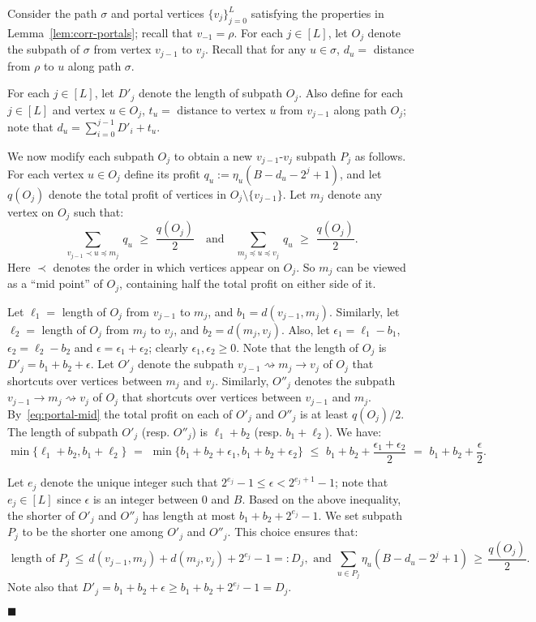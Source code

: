 \documentclass[11pt,letterpaper]{article}
\numberwithin{algorithm}{section}
\newenvironment{proof}{

\noindent{\bf Proof:}}
{\hfill$\blacksquare$


}
\begin{document}
\begin{proof}
Consider the path $\sigma$ and portal vertices $\{v_j\}_{j=0}^L$ satisfying the properties in Lemma~\ref{lem:corr-portals}; recall that $v_{-1}=\rho$. For each $j\in[L]$, let $O_j$ denote the subpath of $\sigma$ from vertex $v_{j-1}$ to $v_j$. Recall that for any $u\in \sigma$, $d_u=$ distance from $\rho$ to $u$ along path $\sigma$.

For each $j\in[L]$, let $D'_j$ denote the length of subpath $O_j$. Also define for each $j\in[L]$ and vertex $u\in O_j$, $t_u=$ distance to vertex $u$ from $v_{j-1}$ along path $O_j$; note that $d_u=\sum_{i=0}^{j-1} D'_i + t_u$.

We now modify each subpath $O_j$ to obtain a new $v_{j-1}$-$v_j$ subpath $P_j$ as follows. For each vertex $u\in O_j$ define its profit $q_u:=\eta_u(B-d_u-2^j+1)$, and let $q(O_j)$ denote the total profit of vertices in $O_j\setminus \{v_{j-1}\}$. Let $m_j$ denote any vertex on $O_j$ such that:
\begin{equation} \label{eq:portal-mid} \sum_{v_{j-1}\prec u \preceq m_j} \, q_u \,\,\ge \,\,\frac{q(O_j)}{2}\quad \mbox{and} \quad  \sum_{m_{j}\preceq u \preceq v_j} \, q_u \,\, \ge \,\,\frac{q(O_j)}{2} .
\end{equation}
Here $\prec$ denotes the order in which vertices appear on $O_j$. So $m_j$ can be viewed as a ``mid point'' of $O_j$, containing half the total profit on either side of it.

Let $\ell_1=$ length of $O_j$ from $v_{j-1}$ to $m_j$, and $b_1=d(v_{j-1},m_j)$. Similarly, let $\ell_2=$ length of $O_j$ from $m_{j}$ to $v_j$, and $b_2=d(m_{j},v_j)$. Also, let $\epsilon_1=\ell_1-b_1$, $\epsilon_2=\ell_2-b_2$ and $\epsilon=\epsilon_1+\epsilon_2$; clearly $\epsilon_1,\epsilon_2\ge 0$. Note that the length of $O_j$ is $D'_j=b_1+b_2+\epsilon$. Let $O'_j$ denote the subpath  $v_{j-1} \rightsquigarrow m_j \rightarrow v_j$ of $O_j$ that shortcuts over vertices between $m_j$ and $v_j$. Similarly, $O''_j$ denotes the subpath  $v_{j-1} \rightarrow m_j \rightsquigarrow v_j$ of $O_j$ that shortcuts over vertices between $v_{j-1}$ and $m_j$. By~\eqref{eq:portal-mid} the total profit on each of $O'_j$ and $O''_j$ is at least $q(O_j)/2$.
The length of subpath $O'_j$ (resp. $O''_j$) is $\ell_1+b_2$ (resp. $b_1+\ell_2$). We have:
$$\min\{\ell_1+b_2, b_1+\ell_2\} \,\, = \,\,  \min\{b_1+b_2+\epsilon_1, b_1+b_2 + \epsilon_2\}   \,\, \le  \,\, b_1+b_2 +\frac{\epsilon_1+\epsilon_2}{2}  \,\, =  \,\, b_1+b_2 +\frac{\epsilon}2.$$

Let $e_j$ denote the unique integer such that $2^{e_j}-1\le \epsilon< 2^{e_j+1}-1$; note that $e_j\in [L]$ since $\epsilon$ is an integer between $0$ and $B$. Based on the above inequality, the shorter of $O'_j$ and $O''_j$ has length at most $b_1+b_2+2^{e_j}-1$. We set subpath $P_j$ to be the shorter one among $O'_j$ and $O''_j$. This choice ensures that:
\begin{equation} \label{eq:enum-subpath}
\mbox{ length of } P_j \,\le\, d(v_{j-1},m_j)+d(m_j,v_j)+2^{e_j}-1=:D_j,\,\,\mbox{and}\,\, \sum_{u\in P_j} \eta_u(B-d_u-2^j+1)\,\ge \, \frac{q(O_j)}{2}.
\end{equation}
Note also that $D'_j=b_1+b_2+\epsilon\ge b_1+b_2+2^{e_j}-1=D_j$.



\end{proof}
\end{document}
